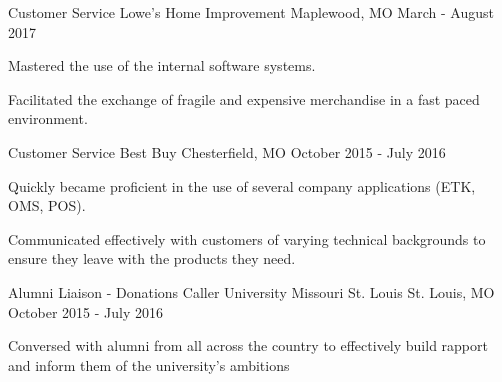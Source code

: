 

\begin{cventries}

  \cventry
    {Customer Service} %
    {Lowe's Home Improvement} %
    {Maplewood, MO} %
    {March - August 2017} %
    {
      \begin{cvitems} %
        \item {Mastered the use of the internal software systems.}
        \item {Facilitated the exchange of fragile and expensive merchandise in a fast paced environment.}
      \end{cvitems}
    }

  \cventry
    {Customer Service} %
    {Best Buy} %
    {Chesterfield, MO} %
    {October 2015 - July 2016} %
    {
      \begin{cvitems} %
        \item {Quickly became proficient in the use of several company applications (ETK, OMS, POS).}
        \item {Communicated effectively with customers of varying technical backgrounds to ensure they leave with the products they need.}
      \end{cvitems}
    }

  \cventry
    {Alumni Liaison - Donations Caller} %
    {University Missouri St. Louis} %
    {St. Louis, MO} %
    {October 2015 - July 2016} %
    {
      \begin{cvitems} %
        \item {Conversed with alumni from all across the country to effectively build rapport and inform them of the university's ambitions}
      \end{cvitems}
    }

\end{cventries}
